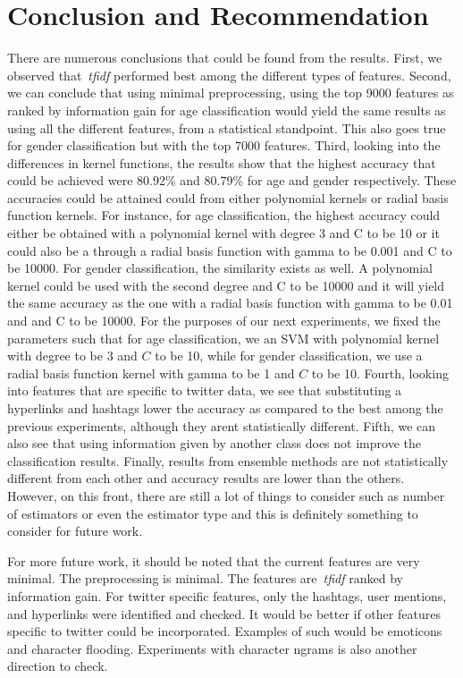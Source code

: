 \documentclass[a4paper]{llncs}
\begin{document}
\section{Conclusion and Recommendation}
There are numerous conclusions that could be found from the results. First, we observed that~\textit{tfidf} performed best among the different types of features. Second, we can conclude that using minimal preprocessing, using the top 9000 features as ranked by information gain for age classification would yield the same results as using all the different features, from a statistical standpoint. This also goes true for gender classification but with the top 7000 features. Third, looking into the differences in kernel functions, the results show that the highest accuracy that could be achieved were 80.92\% and 80.79\% for age and gender respectively. These accuracies could be attained could from either polynomial kernels or radial basis function kernels. For instance, for age classification, the highest accuracy could either be obtained with a polynomial kernel with degree 3 and C to be 10 or it could also be a through a radial basis function with gamma to be 0.001 and C to be 10000. For gender classification, the similarity exists as well. A polynomial kernel could be used with the second degree and C to be 10000 and it will yield the same accuracy as the one with a radial basis function with gamma to be 0.01 and and C to be 10000. For the purposes of our next experiments, we fixed the parameters such that for age classification, we an SVM with polynomial kernel with degree to be 3 and $C$ to be 10, while for gender classification, we use a radial basis function kernel with gamma to be 1 and $C$ to be 10. Fourth, looking into features that are specific to twitter data, we see that substituting a hyperlinks and hashtags lower the accuracy as compared to the best among the previous experiments, although they arent statistically different. Fifth, we can also see that using information given by another class does not improve the classification results. Finally, results from ensemble methods are not statistically different from each other and accuracy results are lower than the others. However, on this front, there are still a lot of things to consider such as number of estimators or even the estimator type and this is definitely something to consider for future work.  

For more future work, it should be noted that the current features are very minimal. The preprocessing is minimal. The features are~\textit{tfidf} ranked by information gain. For twitter specific features, only the hashtags, user mentions, and hyperlinks were identified and checked. It would be better if other features specific to twitter could be incorporated. Examples of such would be emoticons and character flooding. Experiments with character ngrams is also another direction to check. 





\end{document}
